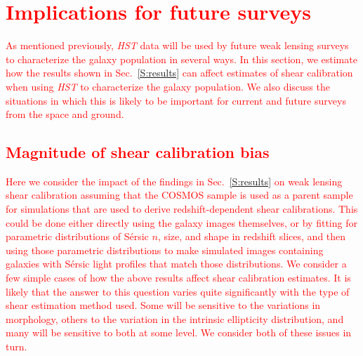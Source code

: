 \documentclass[twocolumn,useAMS,usenatbib]{mn2e}
\newcommand{\rachel}[1]{{\textcolor{red}{#1}}}
\newcommand{\sersic}{S\'{e}rsic }
\begin{document}
\section{\rachel{Implications for future surveys}}\label{S:implications}

\rachel{As mentioned previously, {\em HST} data will be used by future weak
lensing surveys to characterize the galaxy population in several
ways.  In this section, we estimate how the results shown in
Sec.~\ref{S:results} can affect estimates of shear calibration when
using {\em HST} to characterize the galaxy population.  We also
discuss the situations in which this is likely to be important for
current and future surveys from the space and ground.}

\subsection{\rachel{Magnitude of shear calibration bias}}

\rachel{Here we consider the impact of the findings in
  Sec.~\ref{S:results} on weak lensing shear calibration assuming that
  the COSMOS sample is used as a parent sample for simulations that
  are used to derive redshift-dependent shear calibrations.  This
  could be done either directly using the galaxy images themselves, or
  by fitting for parametric distributions of \sersic $n$, size, and
  shape in redshift slices, and then using those parametric
  distributions to make simulated images containing galaxies with
  \sersic light profiles that match those distributions.  We consider a few simple cases of how the
  above results affect shear calibration estimates.  It is likely that
  the answer to this question varies quite significantly with the type
  of shear estimation method used.  Some will be sensitive to the
  variations in morphology, others to the variation in the intrinsic
  ellipticity distribution, and many will be sensitive to both at some
  level.  We consider both of these issues in turn.}
\end{document}
